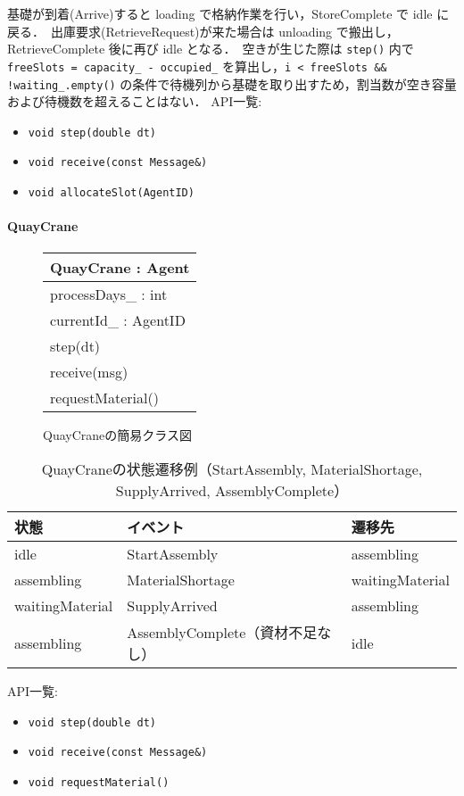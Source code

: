 \documentclass[10pt,letterpaper]{jsarticle}
\begin{document}
基礎が到着(Arrive)すると loading で格納作業を行い，StoreComplete で idle に戻る．\
出庫要求(RetrieveRequest)が来た場合は unloading で搬出し，RetrieveComplete 後に再び idle となる．\
空きが生じた際は \texttt{step()} 内で \texttt{freeSlots = capacity\_ - occupied\_} を算出し，\texttt{i < freeSlots \&\& !waiting\_.empty()} の条件で待機列から基礎を取り出すため，割当数が空き容量および待機数を超えることはない．
API一覧:
\begin{itemize}
  \item \texttt{void step(double dt)}
  \item \texttt{void receive(const Message\&)}
  \item \texttt{void allocateSlot(AgentID)}
\end{itemize}

\paragraph{QuayCrane}
\begin{figure}[htbp]
  \centering
  \begin{tabular}{|l|}
    \hline
    \textbf{QuayCrane} : Agent \\
    \hline
    processDays\_ : int \\
    currentId\_ : AgentID \\
    \hline
    step(dt) \\
    receive(msg) \\
    requestMaterial() \\
    \hline
  \end{tabular}
  \caption{QuayCraneの簡易クラス図}
\end{figure}
\begin{table}[htbp]
  \centering
  \begin{tabular}{lll}
    \toprule
    状態 & イベント & 遷移先 \\
    \midrule
    idle & StartAssembly & assembling \\
    assembling & MaterialShortage & waitingMaterial \\
    waitingMaterial & SupplyArrived & assembling \\
    assembling & AssemblyComplete（資材不足なし） & idle \\
    \bottomrule
  \end{tabular}
  \caption{QuayCraneの状態遷移例（StartAssembly, MaterialShortage, SupplyArrived, AssemblyComplete）}
\end{table}
API一覧:
\begin{itemize}
  \item \texttt{void step(double dt)}
  \item \texttt{void receive(const Message\&)}
  \item \texttt{void requestMaterial()}
\end{itemize}
\end{document}
